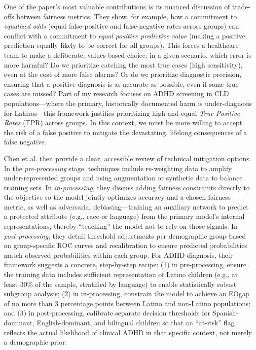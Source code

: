 \documentclass[11pt,twoside]{article}
\DeclareRobustCommand{\EOgap}{EO\text{-}gap\xspace}
\DeclareRobustCommand{\TPR}{TPR\xspace}
\begin{document}
One of the paper’s most valuable contributions is its nuanced discussion of trade-offs between fairness metrics. They show, for example, how a commitment to \textit{equalized odds} (equal false-positive and false-negative rates across groups) can conflict with a commitment to \textit{equal positive predictive value} (making a positive prediction equally likely to be correct for all groups). This forces a healthcare team to make a deliberate, values-based choice: in a given scenario, which error is more harmful? Do we prioritize catching the most true cases (high sensitivity), even at the cost of more false alarms? Or do we prioritize diagnostic precision, ensuring that a positive diagnosis is as accurate as possible, even if some true cases are missed? Part of my research focuses on ADHD screening in CLD populations—where the primary, historically documented harm is under-diagnosis for Latinos—this framework justifies prioritizing high and equal \textit{True Positive Rates} (\TPR) across groups. In this context, we must be more willing to accept the risk of a false positive to mitigate the devastating, lifelong consequences of a false negative.

Chen et al. then provide a clear, accessible review of technical mitigation options. In the \textit{pre-processing} stage, techniques include re-weighting data to amplify under-represented groups and using augmentation or synthetic data to balance training sets. In \textit{in-processing}, they discuss adding fairness constraints directly to the objective so the model jointly optimizes accuracy and a chosen fairness metric, as well as adversarial debiasing—training an auxiliary network to predict a protected attribute (e.g., race or language) from the primary model’s internal representations, thereby “teaching” the model not to rely on those signals. In \textit{post-processing}, they detail threshold adjustments per demographic group based on group-specific ROC curves and recalibration to ensure predicted probabilities match observed probabilities within each group. For ADHD diagnosis, their framework suggests a concrete, step-by-step recipe: (1) in pre-processing, ensure the training data includes sufficient representation of Latino children (e.g., at least 30\% of the sample, stratified by language) to enable statistically robust subgroup analysis; (2) in in-processing, constrain the model to achieve an \EOgap of no more than 3 percentage points between Latino and non-Latino populations; and (3) in post-processing, calibrate separate decision thresholds for Spanish-dominant, English-dominant, and bilingual children so that an “at-risk” flag reflects the actual likelihood of clinical ADHD in that specific context, not merely a demographic prior.
\end{document}
